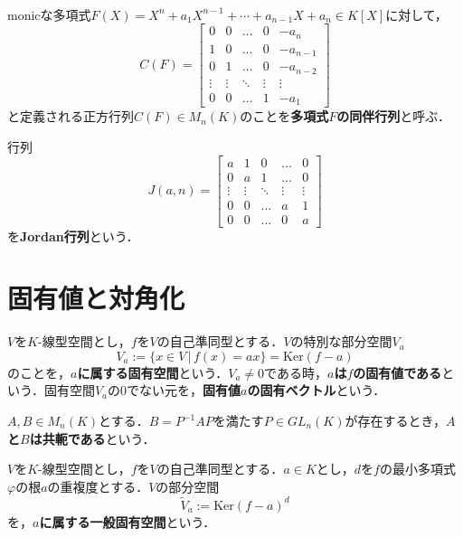 \documentclass[uplatex, dvipdfmx]{jsreport}
\begin{document}
\begin{definition}　\\
    \rm{}monicな多項式$F(X) = X^n+a_1X^{n-1}+\cdots +a_{n-1}X+a_n \in K[X]$に対して，
        $$C(F)=\begin{bmatrix}
        0 & 0 & \dots & 0 & -a_n \\
        1 & 0 & \dots & 0 & -a_{n-1} \\
        0 & 1 & \dots & 0 & -a_{n-2} \\
        \vdots & \vdots & \ddots & \vdots & \vdots \\
        0 & 0 & \dots & 1 & -a_1
        \end{bmatrix}$$
    と定義される正方行列$C(F)\in M_n(K)$のことを\textbf{多項式$F$の同伴行列}と呼ぶ．
\end{definition}
\begin{definition}\rm{}
        行列$$J(a,n)=\begin{bmatrix}
        a & 1 & 0 & \dots & 0 \\
        0 & a & 1 & \dots & 0 \\
        \vdots & \vdots & \ddots & \vdots & \vdots \\
        0 & 0 & \dots & a & 1 \\
        0 & 0 & \dots & 0 & a
        \end{bmatrix}$$
    を\textbf{Jordan行列}という．
\end{definition}

\section{固有値と対角化}
\begin{definition}
    $V$を$K$-線型空間とし，$f$を$V$の自己準同型とする．$V$の特別な部分空間$V_a$
    $$V_a := \{ x\in V \,|\, f(x)=ax \} = \mathrm{Ker} (f-a)$$
    のことを，\textbf{$a$に属する固有空間}という．$V_a\ne 0$である時，\textbf{$a$は$f$の固有値である}という．固有空間$V_a$の$0$でない元を，\textbf{固有値$a$の固有ベクトル}という．
\end{definition}

\begin{definition}[conjugate]
    $A,B\in M_n(K)$とする．$B=P^{-1}AP$を満たす$P\in GL_n(K)$が存在するとき，\textbf{$A$と$B$は共軛である}という．
\end{definition}

\begin{definition}
    $V$を$K$-線型空間とし，$f$を$V$の自己準同型とする．$a\in K$とし，$d$を$f$の最小多項式$\varphi$の根$a$の重複度とする．$V$の部分空間
    $$\widetilde{V}_a:=\mathrm{Ker}(f-a)^d$$
    を，\textbf{$a$に属する一般固有空間}という．
\end{definition}
\end{document}
